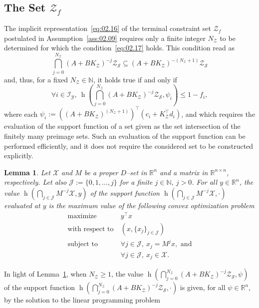 \documentclass[twocolumn]{autart}
\newtheorem{lemma}{Lemma}
\newcommand{\mb}[1]{\mathbb{#1}}
\newcommand{\mc}[1]{\mathcal{#1}}
\newcommand{\N}{\mb{N}}
\newcommand{\R}{\mb{R}}
\newcommand{\Rnm}[2]{\R^{{#1}\times{#2}}}
\newcommand{\support}[2]{\operatorname{h}(#1,#2)}
\newcommand{\supportbb}[1]{\operatorname{h}(#1,\cdot)}
\numberwithin{equation}{section}
\begin{document}
\subsection{The Set $\mc{Z}_f$}
\label{sec:05.06}

The implicit representation~\eqref{eq:02.16} of the terminal constraint set $\mc{Z}_f$ postulated in Assumption~\ref{ass:02.09} requires only a finite integer $N_\mc{Z}$ to be determined for which the condition~\eqref{eq:02.17} holds. This condition read as 
\begin{equation*}
\bigcap_{j=0}^{N_\mc{Z}}(A+BK_\mc{Z})^{-j}\mc{Z}_\mc{S}\subseteq (A+BK_\mc{Z})^{-(N_\mc{Z}+1)}\mc{Z}_\mc{S}
\end{equation*}
and, thus, for a fixed $N_\mc{Z}\in\N$, it holds true if and only if
\begin{equation}
\label{eq:05.06}
\forall i\in\mc{I}_\mc{Y},\  \support{\bigcap_{j=0}^{N_\mc{Z}}(A+BK_\mc{Z})^{-j}\mc{Z}_\mc{S}}{\psi_i}\le 1-f_i,
\end{equation}
where each $\psi_i:=((A+BK_\mc{Z})^{(N_\mc{Z}+1)})^\top (c_i + K_\mc{Z}^\top d_i)$, and which requires the evaluation of the support function of a set given as the set intersection of the finitely many preimage sets. Such an evaluation of the support function can be performed efficiently, and it does not require the considered set to be constructed explicitly. 
\begin{lemma}
\label{lemma:05.01}
Let $\mc{X}$ and $M$ be a proper $D$--set in $\R^n$ and a matrix in $\Rnm{n}{n}$, respectively. Let also $\mc{J}:=\{0,1,\ldots,j\}$ for a finite $j\in\N,\ j>0$.  For all $y\in\R^n$, the value $\support{\bigcap_{j\in\mc{J}} M^{-j}\mc{X}}{y}$ of the support function $\supportbb{\bigcap_{j\in\mc{J}} M^{-j}\mc{X}}$ evaluated at $y$ is the maximum value of the following convex optimization problem
\begin{align*}
\text{maximize}\ &y^\top x\nonumber\\
\text{with respect to}\ &(x,\{x_j\}_{j\in\mc{J}})\nonumber\\
\text{subject to}\ &\forall j\in\mc{J},\ x_j=M^jx,\text{ and}\nonumber\\
&\forall j\in\mc{J},\ x_j\in\mc{X}.
\end{align*}
\end{lemma}
In light of Lemma~\ref{lemma:05.01}, when $N_{\mc{Z}}\ge 1$, the value $\support{\bigcap_{j=0}^{N_\mc{Z}}(A+BK_\mc{Z})^{-j}\mc{Z}_\mc{S}}{\psi}$ of the support function $\supportbb{\bigcap_{j=0}^{N_\mc{Z}}(A+BK_\mc{Z})^{-j}\mc{Z}_\mc{S}}$ is given, for all $\psi\in\R^n$, by the solution to the linear programming problem
\end{document}
